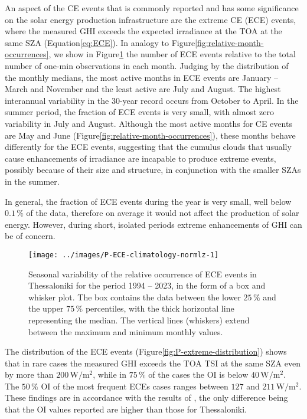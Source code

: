 \documentclass[preprint, 5p,
authoryear]{elsarticle} %
\begin{document}
An aspect of the CE events that is commonly reported and has some
significance on the solar energy production infrastructure are the
extreme CE (ECE) events, where the measured GHI exceeds the expected
irradiance at the TOA at the same SZA
(Equation\nobreakspace{}\ref{eq:ECE}). In analogy to
Figure\nobreakspace{}\ref{fig:relative-month-occurrences}, we show in
Figure\nobreakspace{}\ref{fig:relative-month-occurancies-ECE} the number
of ECE events relative to the total number of one-min observations in
each month. Judging by the distribution of the monthly medians, the most
active months in ECE events are January -- March and November and the
least active are July and August. The highest interannual variability in
the 30-year record occurs from October to April. In the summer period,
the fraction of ECE events is very small, with almost zero variability
in July and August. Although the most active months for CE events are
May and June
(Figure\nobreakspace{}\ref{fig:relative-month-occurrences}), these
months behave differently for the ECE events, suggesting that the
cumulus clouds that usually cause enhancements of irradiance are
incapable to produce extreme events, possibly because of their size and
structure, in conjunction with the smaller SZAs in the summer.

In general, the fraction of ECE events during the year is very small,
well below \(0.1\,\%\) of the data, therefore on average it would not
affect the production of solar energy. However, during short, isolated
periods extreme enhancements of GHI can be of concern.

\begin{figure}

{\centering \texttt{[image: ../images/P-ECE-climatology-normlz-1]} 

}

\caption{Seasonal variability of the relative occurrence of ECE events in Thessaloniki for the period 1994 -- 2023, in the form of a box and whisker plot. The box contains the data between the lower $25\,\%$ and the upper $75\,\%$ percentiles, with the thick horizontal line representing the median. The vertical lines (whiskers) extend between the maximum and minimum monthly values.}\label{fig:relative-month-occurancies-ECE}
\end{figure}

The distribution of the ECE events
(Figure\nobreakspace{}\ref{fig:P-extreme-distribution}) shows that in
rare cases the measured GHI exceeds the TOA TSI at the same SZA even by
more than \(200\,\text{W}/\text{m}^2\), while in \(75\,\%\) of the cases
the OI is below \(40\,\text{W}/\text{m}^2\). The \(50\,\%\) OI of the
most frequent ECEs cases ranges between \(127\) and
\(211\,\text{W}/\text{m}^2\). These findings are in accordance with the
results of \citet{Vamvakas2020}, the only difference being that the OI
values reported are higher than those for Thessaloniki.
\end{document}
